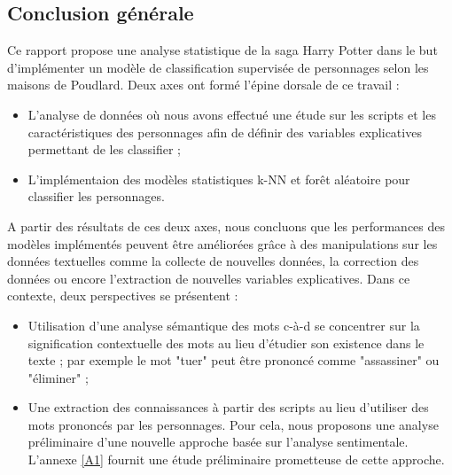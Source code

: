 \documentclass[11pt]{article}
\begin{document}
\begin{center}
\newpage

\section{Conclusion générale}

Ce rapport propose une analyse statistique de la saga Harry Potter dans le but d'implémenter un modèle de classification supervisée de personnages selon les maisons de Poudlard. Deux axes ont formé l'épine dorsale de ce travail :

\begin{itemize}
    \renewcommand{\labelitemi}{-}
    \item L'analyse de données où nous avons effectué une étude sur les scripts et les caractéristiques des personnages afin de définir des variables explicatives permettant de les classifier ;
    \item L'implémentaion des modèles statistiques k-NN et forêt aléatoire pour classifier les personnages.
\end{itemize}

A partir des résultats de ces deux axes, nous concluons que les performances des modèles implémentés peuvent être améliorées grâce à des manipulations sur les données textuelles comme la collecte de nouvelles données, la correction des données ou encore l'extraction de nouvelles variables explicatives. Dans ce contexte, deux perspectives se présentent :

\begin{itemize}
    \renewcommand{\labelitemi}{-}
    \item Utilisation d'une analyse sémantique des mots c-à-d se concentrer sur la signification contextuelle des mots au lieu d'étudier son existence dans le texte ; par exemple le mot "tuer" peut être prononcé comme "assassiner" ou "éliminer" ;
    
    \item Une extraction des connaissances à partir des scripts au lieu d'utiliser des mots prononcés par les personnages. Pour cela, nous proposons une analyse préliminaire d'une nouvelle approche basée sur l'analyse sentimentale. L'annexe \ref{A1} fournit une étude préliminaire prometteuse de cette approche.
\end{itemize}

\newpage

\appendix


\end{center}
\end{document}
